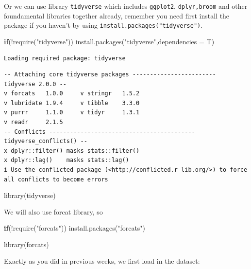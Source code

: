 \documentclass[
  letterpaper,
  DIV=11,
  numbers=noendperiod]{scrreprt}
\newenvironment{Shaded}{\begin{snugshade}}{\end{snugshade}}
\newcommand{\AttributeTok}[1]{\textcolor[rgb]{0.40,0.45,0.13}{#1}}
\newcommand{\ControlFlowTok}[1]{\textcolor[rgb]{0.00,0.23,0.31}{\textbf{#1}}}
\newcommand{\FunctionTok}[1]{\textcolor[rgb]{0.28,0.35,0.67}{#1}}
\newcommand{\NormalTok}[1]{\textcolor[rgb]{0.00,0.23,0.31}{#1}}
\newcommand{\SpecialCharTok}[1]{\textcolor[rgb]{0.37,0.37,0.37}{#1}}
\newcommand{\StringTok}[1]{\textcolor[rgb]{0.13,0.47,0.30}{#1}}
\begin{document}
Or we can use library \texttt{tidyverse} which includes
\texttt{ggplot2}, \texttt{dplyr,broom} and other foundamental libraries
together already, remember you need first install the package if you
haven't by using \texttt{install.packages("tidyverse")}.

\begin{Shaded}
\begin{Highlighting}[]
\ControlFlowTok{if}\NormalTok{(}\SpecialCharTok{!}\FunctionTok{require}\NormalTok{(}\StringTok{"tidyverse"}\NormalTok{))}
  \FunctionTok{install.packages}\NormalTok{(}\StringTok{"tidyverse"}\NormalTok{,}\AttributeTok{dependencies =}\NormalTok{ T)}
\end{Highlighting}
\end{Shaded}

\begin{verbatim}
Loading required package: tidyverse
\end{verbatim}

\begin{verbatim}
-- Attaching core tidyverse packages ------------------------ tidyverse 2.0.0 --
v forcats   1.0.0     v stringr   1.5.2
v lubridate 1.9.4     v tibble    3.3.0
v purrr     1.1.0     v tidyr     1.3.1
v readr     2.1.5     
-- Conflicts ------------------------------------------ tidyverse_conflicts() --
x dplyr::filter() masks stats::filter()
x dplyr::lag()    masks stats::lag()
i Use the conflicted package (<http://conflicted.r-lib.org/>) to force all conflicts to become errors
\end{verbatim}

\begin{Shaded}
\begin{Highlighting}[]
\FunctionTok{library}\NormalTok{(tidyverse)}
\end{Highlighting}
\end{Shaded}

We will also use forcat library, so

\begin{Shaded}
\begin{Highlighting}[]
\ControlFlowTok{if}\NormalTok{(}\SpecialCharTok{!}\FunctionTok{require}\NormalTok{(}\StringTok{"forcats"}\NormalTok{))}
  \FunctionTok{install.packages}\NormalTok{(}\StringTok{"forcats"}\NormalTok{)}

\FunctionTok{library}\NormalTok{(forcats)}
\end{Highlighting}
\end{Shaded}

Exactly as you did in previous weeks, we first load in the dataset:
\end{document}
